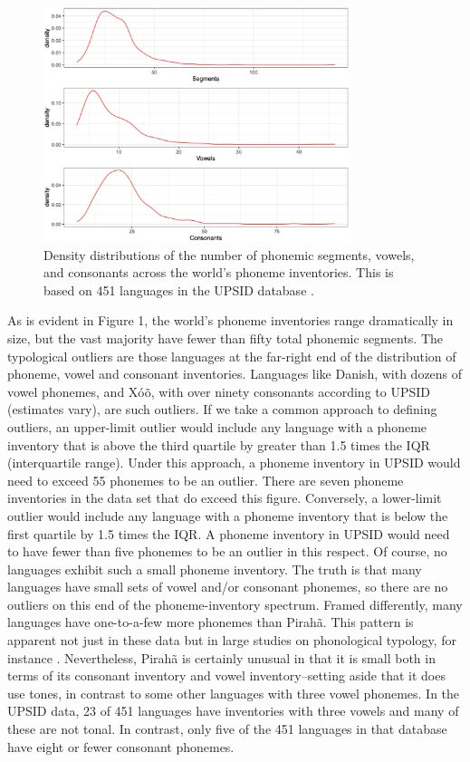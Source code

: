 \documentclass[output=paper,colorlinks,citecolor=brown
]{langscibook}
\begin{document}
    
\begin{figure}
\centering
\includegraphics[width=0.8\textwidth]{everett_figure1.png}
\caption{\label{fig:Figure 1}Density distributions of the number of phonemic segments, vowels, and consonants across the world’s phoneme inventories. This is based on 451 languages in the UPSID database \citep{maddieson1989updating}. }
\end{figure}
    As is evident in Figure 1, the world’s phoneme inventories range dramatically in size, but the vast majority have fewer than fifty total phonemic segments. The typological outliers are those languages at the far-right end of the distribution of phoneme, vowel and consonant inventories. Languages like Danish, with dozens of vowel phonemes, and Xóõ, with over ninety consonants according to UPSID (estimates vary), are such outliers. If we take a common approach to defining outliers, an upper-limit outlier would include any language with a phoneme inventory that is above the third quartile by greater than 1.5 times the IQR (interquartile range). Under this approach, a phoneme inventory in UPSID would need to exceed 55 phonemes to be an outlier. There are seven phoneme inventories in the data set that do exceed this figure. Conversely, a lower-limit outlier would include any language with a phoneme inventory that is below the first quartile by 1.5 times the IQR. A phoneme inventory in UPSID would need to have fewer than five phonemes to be an outlier in this respect. Of course, no languages exhibit such a small phoneme inventory. The truth is that many languages have small sets of vowel and/or consonant phonemes, so there are no outliers on this end of the phoneme-inventory spectrum. Framed differently, many languages have one-to-a-few more phonemes than Pirahã. This pattern is apparent not just in these data but in large studies on phonological typology, for instance . Nevertheless, Pirahã is certainly unusual in that it is small both in terms of its consonant inventory and vowel inventory–setting aside that it does use tones, in contrast to some other languages with three vowel phonemes. In the UPSID data, 23 of 451 languages have inventories with three vowels and many of these are not tonal. In contrast, only five of the 451 languages in that database have eight or fewer consonant phonemes. 
    
\end{document}
